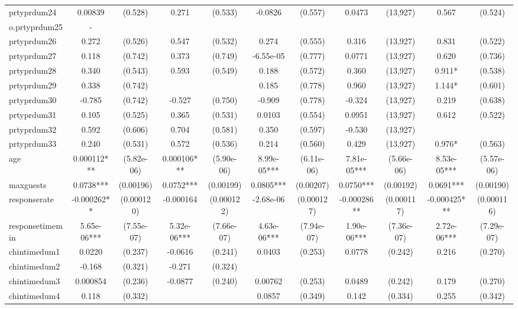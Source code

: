 \documentclass[]{article}
\begin{document}
\begin{tabular}{lcccccccccc}
prtyprdum24 & 0.00839 & (0.528) & 0.271 & (0.533) & -0.0826 & (0.557) & 0.0473 & (13,927) & 0.567 & (0.524) \\
o.prtyprdum25 & - &  &  &  &  &  &  &  &  &  \\
prtyprdum26 & 0.272 & (0.526) & 0.547 & (0.532) & 0.274 & (0.555) & 0.316 & (13,927) & 0.831 & (0.522) \\
prtyprdum27 & 0.118 & (0.742) & 0.373 & (0.749) & -6.55e-05 & (0.777) & 0.0771 & (13,927) & 0.620 & (0.736) \\
prtyprdum28 & 0.340 & (0.543) & 0.593 & (0.549) & 0.188 & (0.572) & 0.360 & (13,927) & 0.911* & (0.538) \\
prtyprdum29 & 0.338 & (0.742) &  &  & 0.185 & (0.778) & 0.960 & (13,927) & 1.144* & (0.601) \\
prtyprdum30 & -0.785 & (0.742) & -0.527 & (0.750) & -0.909 & (0.778) & -0.324 & (13,927) & 0.219 & (0.638) \\
prtyprdum31 & 0.105 & (0.525) & 0.365 & (0.531) & 0.0103 & (0.554) & 0.0951 & (13,927) & 0.612 & (0.522) \\
prtyprdum32 & 0.592 & (0.606) & 0.704 & (0.581) & 0.350 & (0.597) & -0.530 & (13,927) &  &  \\
prtyprdum33 & 0.240 & (0.531) & 0.572 & (0.536) & 0.214 & (0.560) & 0.429 & (13,927) & 0.976* & (0.563) \\
age & 0.000112*** & (5.82e-06) & 0.000106*** & (5.90e-06) & 8.99e-05*** & (6.11e-06) & 7.81e-05*** & (5.66e-06) & 8.53e-05*** & (5.57e-06) \\
maxguests & 0.0738*** & (0.00196) & 0.0752*** & (0.00199) & 0.0805*** & (0.00207) & 0.0750*** & (0.00192) & 0.0691*** & (0.00190) \\
responserate & -0.000262** & (0.000120) & -0.000164 & (0.000122) & -2.68e-06 & (0.000127) & -0.000286** & (0.000117) & -0.000425*** & (0.000116) \\
responsetimemin & 5.65e-06*** & (7.55e-07) & 5.32e-06*** & (7.66e-07) & 4.63e-06*** & (7.94e-07) & 1.90e-06*** & (7.36e-07) & 2.72e-06*** & (7.29e-07) \\
chintimedum1 & 0.0220 & (0.237) & -0.0616 & (0.241) & 0.0403 & (0.253) & 0.0778 & (0.242) & 0.216 & (0.270) \\
chintimedum2 & -0.168 & (0.321) & -0.271 & (0.324) &  &  &  &  &  &  \\
chintimedum3 & 0.000854 & (0.236) & -0.0877 & (0.240) & 0.00762 & (0.253) & 0.0489 & (0.242) & 0.179 & (0.270) \\
chintimedum4 & 0.118 & (0.332) &  &  & 0.0857 & (0.349) & 0.142 & (0.334) & 0.255 & (0.342) \\

\end{tabular}
\end{document}
